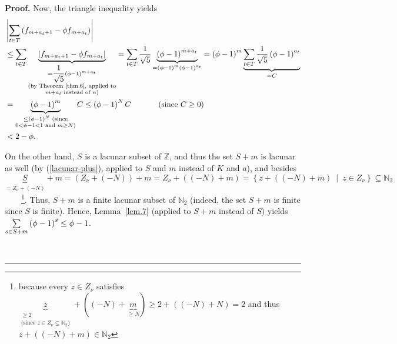 \documentclass[numbers=enddot,12pt,final,onecolumn,notitlepage]{scrartcl}%
\numberwithin{exer}{section}
\theoremstyle{definition}
\newenvironment{proof}[1][Proof]{\noindent\textbf{#1.} }{\ \rule{0.5em}{0.5em}}
\let\sumnonlimits\sum
\renewcommand{\sum}{\sumnonlimits\limits}
\begin{document}
\begin{proof}
Now, the triangle inequality yields%
\begin{align*}
&  \left\vert \sum\limits_{t\in T}\left(  f_{m+a_{t}+1}-\phi f_{m+a_{t}%
}\right)  \right\vert \\
&  \leq\sum\limits_{t\in T}\underbrace{\left\vert f_{m+a_{t}+1}-\phi
f_{m+a_{t}}\right\vert }_{\substack{=\dfrac{1}{\sqrt{5}}\left(  \phi-1\right)
^{m+a_{t}}\\\text{(by Theorem~\ref{thm.6}, applied to}\\m+a_{t}\text{ instead
of }n\text{)}}}=\sum\limits_{t\in T}\dfrac{1}{\sqrt{5}}\underbrace{\left(
\phi-1\right)  ^{m+a_{t}}}_{=\left(  \phi-1\right)  ^{m}\left(  \phi-1\right)
^{a_{t}}}=\left(  \phi-1\right)  ^{m}\underbrace{\sum\limits_{t\in T}\dfrac
{1}{\sqrt{5}}\left(  \phi-1\right)  ^{a_{t}}}_{=C}\\
&  =\underbrace{\left(  \phi-1\right)  ^{m}}_{\substack{\leq\left(
\phi-1\right)  ^{N}\text{ (since}\\0<\phi-1<1\text{ and }m\geq N\text{)}%
}}C\leq\left(  \phi-1\right)  ^{N}C\ \ \ \ \ \ \ \ \ \ \left(  \text{since
}C\geq0\right) \\
&  <2-\phi.
\end{align*}


On the other hand, $S$ is a lacunar subset of $\mathbb{Z}$, and thus the set
$S+m$ is lacunar as well (by (\ref{lacunar-plus}), applied to $S$ and $m$
instead of $K$ and $a$), and besides $\underbrace{S}_{=Z_{\nu}+\left(
-N\right)  }+m=\left(  Z_{\nu}+\left(  -N\right)  \right)  +m=Z_{\nu}+\left(
\left(  -N\right)  +m\right)  =\left\{  z+\left(  \left(  -N\right)
+m\right)  \ \mid\ z\in Z_{\nu}\right\}  \subseteq\mathbb{N}_{2}%
$\ \ \ \ \footnote{because every $z\in Z_{\nu}$ satisfies $\underbrace{z}%
_{\substack{\geq2\\\text{(since }z\in Z_{\nu}\subseteq\mathbb{N}_{2}\text{)}%
}}+\left(  \left(  -N\right)  +\underbrace{m}_{\geq N}\right)  \geq2+\left(
\left(  -N\right)  +N\right)  =2$ and thus $z+\left(  \left(  -N\right)
+m\right)  \in\mathbb{N}_{2}$}. Thus, $S+m$ is a finite lacunar subset of
$\mathbb{N}_{2}$ (indeed, the set $S+m$ is finite since $S$ is finite). Hence,
Lemma~\ref{lem.7} (applied to $S+m$ instead of $S$) yields $\sum\limits_{s\in
S+m}\left(  \phi-1\right)  ^{s}\leq\phi-1$.


\end{proof}
\end{document}
